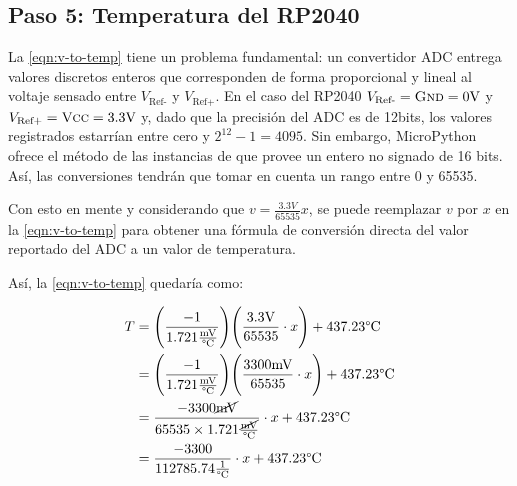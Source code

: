 %
%



\subsection{Paso 5: Temperatura del RP2040}%
\label{sec:step5}

La \cref{eqn:v-to-temp} tiene un problema fundamental: un convertidor ADC entrega valores discretos enteros que corresponden de forma proporcional y lineal al voltaje sensado entre $V_\text{Ref-}$ y $V_\text{Ref+}$.
En el caso del RP2040 $V_\text{Ref-} = \text{\textsc{Gnd}} = 0\text{V}$ y $V_\text{Ref+} = \text{\textsc{Vcc}} = 3.3\text{V}$ y, dado que la precisión del ADC es de 12bits, los valores registrados estarrían entre cero y $2^{12}-1 = 4095$.
Sin embargo, MicroPython ofrece el método  de las instancias de  que provee un entero no signado de 16 bits.
Así, las conversiones tendrán que tomar en cuenta un rango entre 0 y 65535.

Con esto en mente y considerando que $v = \frac{3.3V}{65535}x$, se puede reemplazar $v$ por $x$ en la \cref{eqn:v-to-temp} para obtener una fórmula de conversión directa del valor reportado del ADC a un valor de temperatura.

\noindent
Así, la \cref{eqn:v-to-temp} quedaría como:

\begin{align*}%
	\label{eqn:adc-to-temp}
	T &=%
		\Bigg( \frac{-1}{1.721\frac{\text{mV}}{\text{°C}}} \Bigg)
		\Bigg( \frac{3.3\text{V}}{65535} \cdot x \Bigg) +
		437.23\text{°C} \\
%
	  &=
		\Bigg( \frac{-1}{1.721\frac{\text{mV}}{\text{°C}}} \Bigg)
		\Bigg( \frac{3300\text{mV}}{65535} \cdot x \Bigg) +
		437.23\text{°C} \\
%
	  &=
		\frac{
			-3300\cancel{\text{mV}}
		}{
			65535 \times 1.721\frac{\cancel{\text{mV}}}{\text{°C}}
		}
		\cdot x +
		437.23\text{°C} \\
%
	  &=
		\frac{
			-3300
		}{
			112785.74\frac{1}{\text{°C}}
		}
		\cdot x +
		437.23\text{°C} \\
\end{align*}

